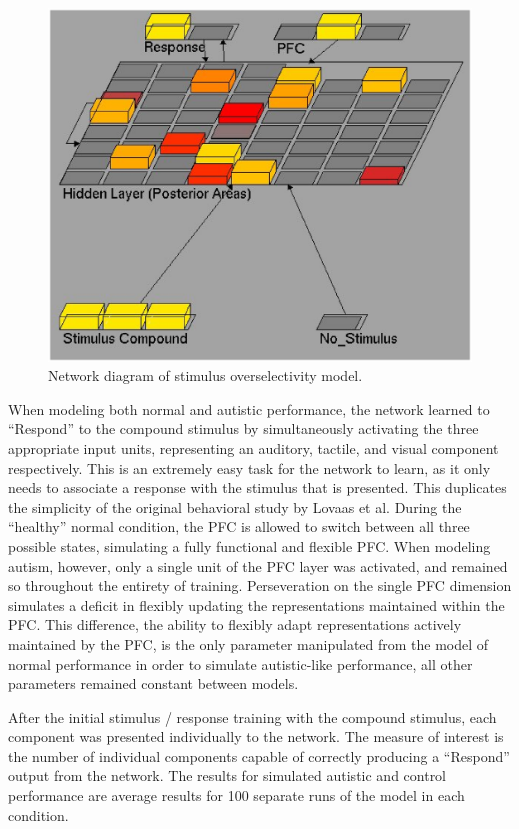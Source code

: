 \begin{figure}
\begin{center}
	\includegraphics[width=125mm]{figures/overselectivity_network.ps}
\end{center}
\caption{Network diagram of stimulus overselectivity model.} 
\label{network-diagram-2}
\end{figure}

When modeling both normal and autistic performance, the network learned to ``Respond'' to the compound stimulus by simultaneously activating the three appropriate input units, representing an auditory, tactile, and visual component respectively.  This is an extremely easy task for the network to learn, as it only needs to associate a response with the stimulus that is presented.  This duplicates the simplicity of the original behavioral study by Lovaas et al.  During the ``healthy'' normal condition, the PFC is allowed to switch between all three possible states, simulating a fully functional and flexible PFC.  When modeling autism, however, only a single unit of the PFC layer was activated, and remained so throughout the entirety of training.   Perseveration on the single PFC dimension simulates a deficit in flexibly updating the representations maintained within the PFC.  This difference, the ability to flexibly adapt representations actively maintained by the PFC, is the only parameter manipulated from the model of normal performance in order to simulate autistic-like performance, all other parameters remained constant between models.

After the initial stimulus / response training with the compound stimulus, each component was presented individually to the network. The measure of interest is the number of individual components capable of correctly producing a ``Respond'' output from the network.  The results for simulated autistic and control performance are average results for 100 separate runs of the model in each condition.

